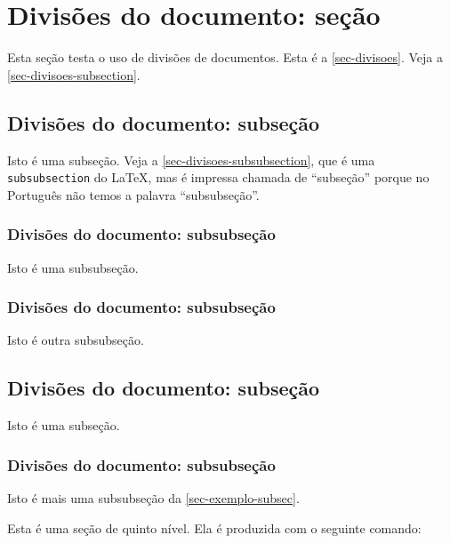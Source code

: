     \section{Divisões do documento: seção}\label{sec-divisoes}

    Esta seção testa o uso de divisões de documentos. Esta é a
    \autoref{sec-divisoes}. Veja a \autoref{sec-divisoes-subsection}.

    \subsection{Divisões do documento: subseção}\label{sec-divisoes-subsection}

    Isto é uma subseção. Veja a \autoref{sec-divisoes-subsubsection}, que é uma
    \texttt{subsubsection} do \LaTeX, mas é impressa chamada de ``subseção'' porque
    no Português não temos a palavra ``subsubseção''.

    \subsubsection{Divisões do documento: subsubseção}
    \label{sec-divisoes-subsubsection}

    Isto é uma subsubseção.

    \subsubsection{Divisões do documento: subsubseção}

    Isto é outra subsubseção.

    \subsection{Divisões do documento: subseção}\label{sec-exemplo-subsec}

    Isto é uma subseção.

    \subsubsection{Divisões do documento: subsubseção}

    Isto é mais uma subsubseção da \autoref{sec-exemplo-subsec}.


    \label{sec-exemplo-subsubsubsection}

    Esta é uma seção de quinto nível. Ela é produzida com o seguinte comando:


